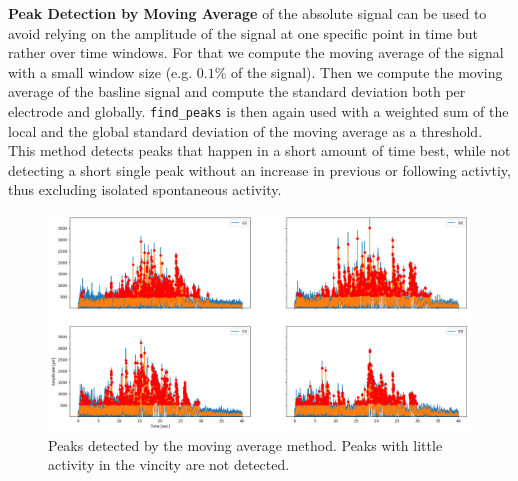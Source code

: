 \documentclass[11pt, twocolumn]{article}
\begin{document}
    \textbf{Peak Detection by Moving Average} of the absolute signal can be used to avoid relying on the amplitude of the signal at one specific point in time but rather over time windows. For that we compute the moving average of the signal with a small window size (e.g. $0.1\%$ of the signal). Then we compute the moving average of the basline signal and compute the standard deviation both per electrode and globally. \texttt{find\_peaks} is then again used with a weighted sum of the local and the global standard deviation of the moving average as a threshold. This method detects peaks that happen in a short amount of time best, while not detecting a short single peak without an increase in previous or following activtiy, thus excluding isolated spontaneous activity.
	\begin{figure}
     \begin{center}
      \includegraphics[keepaspectratio, width=\linewidth]{img/4_peaks_avg.png}
     \end{center}
		\caption{Peaks detected by the moving average method. Peaks with little activity in the vincity are not detected.}
    \end{figure}
\end{document}
